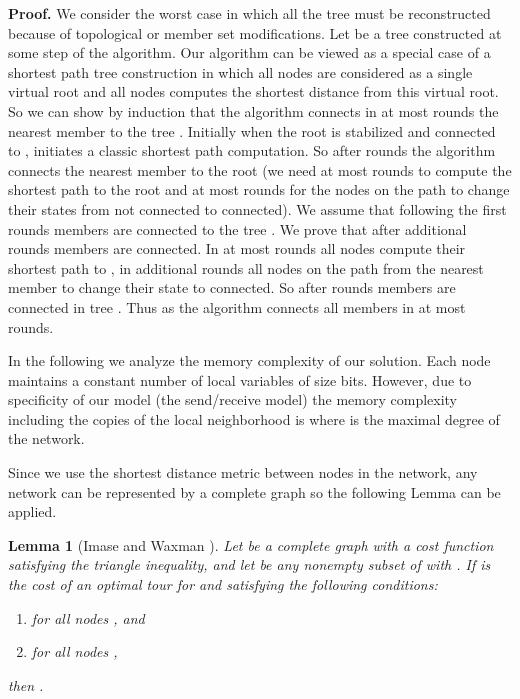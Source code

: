 \documentclass[11pt]{article}
\newtheorem{lemma}{Lemma}
\newenvironment{proof}{\noindent \begin{rm}{\textbf{Proof.} }}{\hspace*{\fill}\par\end{rm} \vspace{.3cm}}
\begin{document}
\begin{proof}
We consider the worst case in which all the tree must be reconstructed
because of topological or member set modifications. Let
 be a tree constructed at some step  of the
algorithm. Our algorithm can be viewed as a special case of a shortest
path tree construction in which all nodes  are
considered as a single virtual root and all nodes 
computes the shortest distance from this virtual root. So we can show
by induction that the algorithm connects in at most  rounds the
nearest member to the tree . Initially when the root  is
stabilized and connected to ,  initiates a classic shortest
path computation. So after  rounds the algorithm connects the
nearest member to the root (we need at most  rounds to compute the
shortest path to the root and at most  rounds for the nodes on the
path to change their states from not connected to connected). We
assume that following the first  rounds  members are connected
to the tree . We prove that after  additional rounds 
members are connected. In at most  rounds all nodes  compute their shortest path to , in additional  rounds
all nodes on the path from the nearest member  to
 change their state to connected. So after  rounds 
members are connected in tree . Thus as  the
algorithm connects all members in at most  rounds.

In the following we analyze the memory complexity of our solution.
Each node maintains a constant number of 
local variables of size  bits. However, due 
to specificity of our model (the send/receive model) the memory 
complexity including the copies of the local neighborhood is
 where  is the maximal degree of the network.
\end{proof}


 Since we use the shortest distance metric between nodes in the network, any network can be represented by a complete graph so the following Lemma can be applied.

\begin{lemma}[Imase and Waxman \cite{ImaseWaxman91}]
\label{lem:ImaseWaxman91}
Let  be a complete graph with a cost function  satisfying the triangle inequality, and let  be any nonempty subset of  with . If  is the cost of an optimal tour for  and  satisfying the following conditions:
\begin{enumerate}
\item  for all nodes , and
\item  for all nodes ,
\end{enumerate}
then .
\end{lemma}
\end{document}
